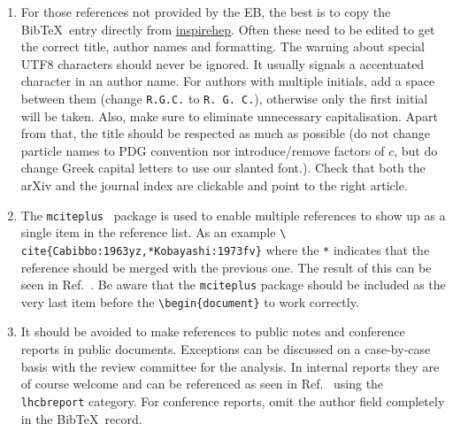 \begin{enumerate}
\item For those references not provided by the EB, the best
  is to copy the Bib\TeX\ entry directly from
  \href{http://inspirehep.net}{inspirehep}.
    Often these need to be edited to get the 
  correct title, author names and formatting. The warning about special UTF8 characters should never be ignored. It usually signals a accentuated character in an author name.
  For authors with multiple initials, add a space between them (change \texttt{R.G.C.} to \texttt{R. G. C.}),
  otherwise only the first initial will be taken. 
  Also, make sure to eliminate unnecessary capitalisation.
  Apart from that, the title should be respected as much as possible
  (\eg do not change particle names to PDG convention nor introduce/remove factors of $c$, but do change Greek capital letters to use our slanted font.).
  Check that both the arXiv and the journal index are clickable
  and point to the right article.


\item The \texttt{mciteplus}~\cite{mciteplus} package is used
  to enable multiple references to show up as a single item in the
  reference list. As an example \texttt{\textbackslash
    cite\{Cabibbo:1963yz,*Kobayashi:1973fv\}} where the \texttt{*}
  indicates that the reference should be merged with the previous
  one. The result of this can be seen in
  Ref.~\cite{Cabibbo:1963yz,*Kobayashi:1973fv}. Be aware that the
  \texttt{mciteplus} package should be included as the very last item
  before the \texttt{\textbackslash begin\{document\}} to work
  correctly.

\item It should be avoided to make references to public notes and
  conference reports in public documents. Exceptions can be discussed
  on a case-by-case basis with the review committee for the
  analysis. In internal reports they are of course welcome and can be
  referenced as seen in Ref.~\cite{LHCb-CONF-2011-003} using the
  \texttt{lhcbreport} category. For conference reports, omit the
  author field completely in the Bib\TeX\ record.


\end{enumerate}
